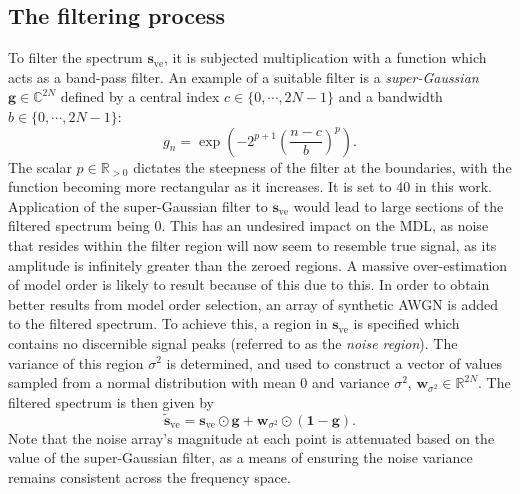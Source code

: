 \subsection{The filtering process}
To filter the spectrum $\symbf{s}_{\text{ve}}$, it is subjected multiplication
with a function which acts as a band-pass filter. An example of a suitable
filter is a \emph{super-Gaussian} $\symbf{g} \in \mathbb{C}^{2N}$ defined by a
central index  $c \in \lbrace 0, \cdots, 2N-1 \rbrace$ and a bandwidth $b \in
\lbrace 0, \cdots, 2N-1 \rbrace$:
\begin{equation}
    g_n = \exp \left(-2^{p+1} \left(\frac{n - c}{b}\right)^p\right).
    \label{eq:super-Gaussian-onedim}
\end{equation}
The scalar $p \in \mathbb{R}_{>0}$ dictates the steepness
of the filter at the boundaries, with the function becoming more rectangular
as it increases. It is set to $40$ in this work. Application of the
super-Gaussian filter to $\symbf{s}_{\text{ve}}$
would lead to large sections of the filtered spectrum being $0$. This has an
undesired impact on the \ac{MDL}, as noise that resides within the filter
region will now seem to resemble true signal,
as its amplitude is infinitely greater than the zeroed regions. A massive
over-estimation of model order is likely to result because of this due to this.
In order to obtain better results from model order selection, an array of
synthetic \ac{AWGN} is
added to the filtered spectrum. To achieve this, a region in
$\symbf{s}_{\text{ve}}$ is specified which contains no discernible signal peaks
(referred to as the \emph{noise region}). The variance of this region
$\sigma^2$ is determined, and used to construct a vector of values sampled from
a normal distribution with mean $0$ and variance $\sigma^2$,
$\symbf{w}_{\sigma^2} \in \mathbb{R}^{2N}$.
The filtered spectrum is then given by
\begin{equation}
    \widetilde{\symbf{s}}_{\text{ve}} = \symbf{s}_{\text{ve}} \odot \symbf{g} + \symbf{w}_{\sigma^2} \odot \left(\symbf{1} - \symbf{g} \right).
    \label{eq:Sve-tilde}
\end{equation}
Note that the noise array's magnitude at each point is attenuated based on the
value of the super-Gaussian filter, as a means of ensuring the noise variance
remains consistent across the frequency space.

